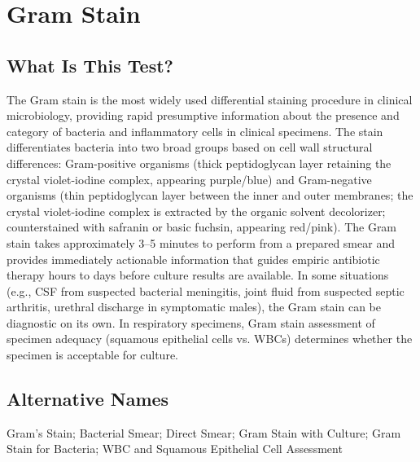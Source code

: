 \chapter{Gram Stain}

\section*{What Is This Test?}
The Gram stain is the most widely used differential staining procedure in clinical microbiology, providing rapid presumptive information about the presence and category of bacteria and inflammatory cells in clinical specimens. The stain differentiates bacteria into two broad groups based on cell wall structural differences: Gram-positive organisms (thick peptidoglycan layer retaining the crystal violet-iodine complex, appearing purple/blue) and Gram-negative organisms (thin peptidoglycan layer between the inner and outer membranes; the crystal violet-iodine complex is extracted by the organic solvent decolorizer; counterstained with safranin or basic fuchsin, appearing red/pink). The Gram stain takes approximately 3--5 minutes to perform from a prepared smear and provides immediately actionable information that guides empiric antibiotic therapy hours to days before culture results are available. In some situations (e.g., CSF from suspected bacterial meningitis, joint fluid from suspected septic arthritis, urethral discharge in symptomatic males), the Gram stain can be diagnostic on its own. In respiratory specimens, Gram stain assessment of specimen adequacy (squamous epithelial cells vs. WBCs) determines whether the specimen is acceptable for culture.

\section*{Alternative Names}
Gram's Stain; Bacterial Smear; Direct Smear; Gram Stain with Culture; Gram Stain for Bacteria; WBC and Squamous Epithelial Cell Assessment

